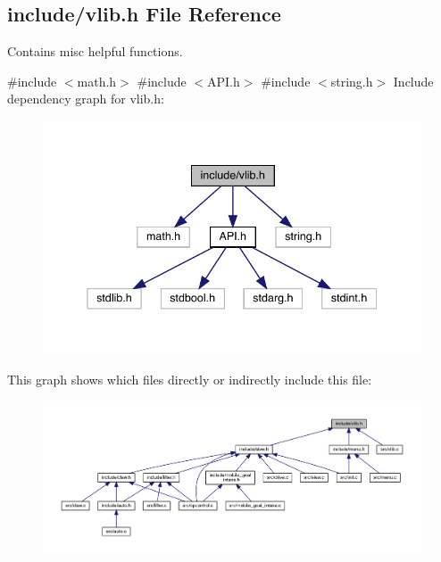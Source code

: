 \subsection{include/vlib.h File Reference}
\label{vlib_8h}


Contains misc helpful functions.  


{\ttfamily \#include $<$math.\+h$>$}\newline
{\ttfamily \#include $<$A\+P\+I.\+h$>$}\newline
{\ttfamily \#include $<$string.\+h$>$}\newline
Include dependency graph for vlib.\+h\+:\nopagebreak
\begin{figure}[H]
\begin{center}
\leavevmode
\includegraphics[width=338pt]{vlib_8h__incl}
\end{center}
\end{figure}
This graph shows which files directly or indirectly include this file\+:\nopagebreak
\begin{figure}[H]
\begin{center}
\leavevmode
\includegraphics[width=350pt]{vlib_8h__dep__incl}
\end{center}
\end{figure}
